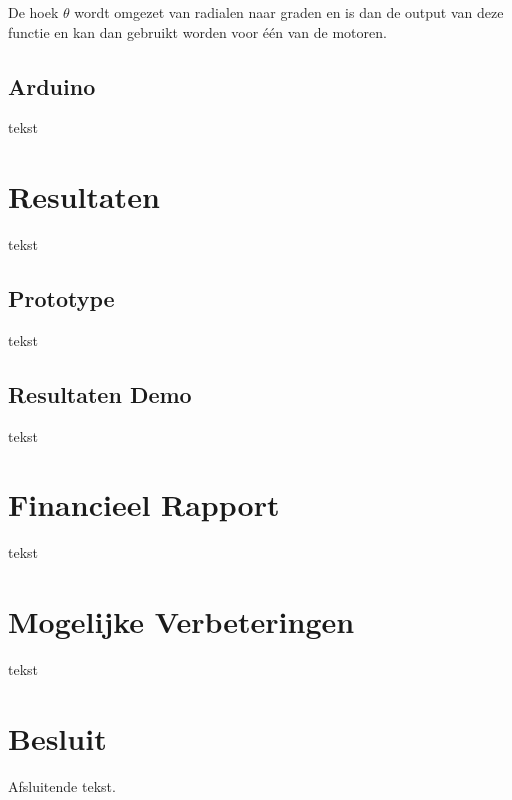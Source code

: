 \documentclass[kulak]{kulakarticle} %
\begin{document}
		De hoek \(\theta\) wordt omgezet van radialen naar graden en is dan de output van deze functie en kan dan gebruikt worden voor één van de motoren.
	\subsection{Arduino}
	
	tekst
	
	
	
	\section{Resultaten}
	
	tekst
	
	
	\subsection{Prototype}
	
	tekst
	
	
	\subsection{Resultaten Demo}
	
	tekst
	
	
	
	\section{Financieel Rapport}
	
	tekst
	
	
	
	\section{Mogelijke Verbeteringen}
	
	tekst
	
	
	
	\section*{Besluit}
	
	Afsluitende tekst.
	
	
	
	
	
	
	
	
\end{document}
